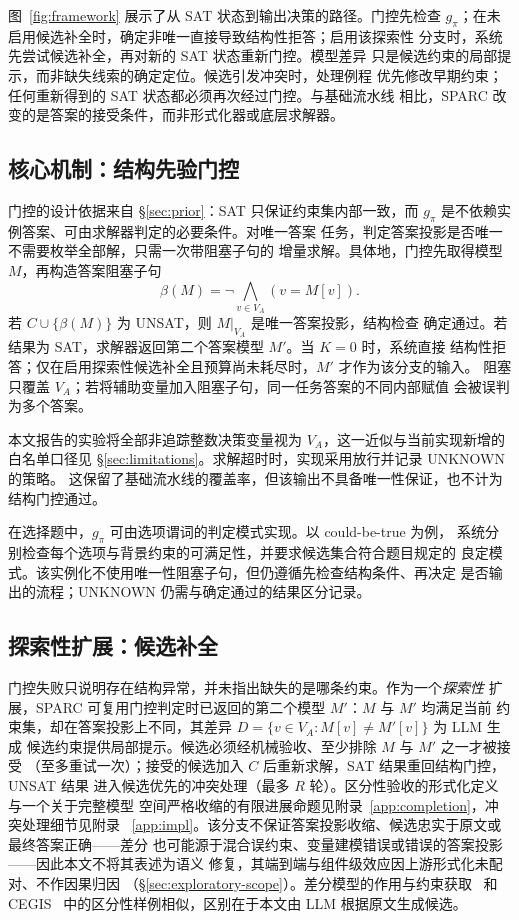 \documentclass[letterpaper]{article}
\newcommand{\method}{SPARC}
\begin{document}
图~\ref{fig:framework} 展示了从 SAT 状态到输出决策的路径。门控先检查
$g_{\pi}$；在未启用候选补全时，确定非唯一直接导致结构性拒答；启用该探索性
分支时，系统先尝试候选补全，再对新的 SAT 状态重新门控。模型差异
只是候选约束的局部提示，而非缺失线索的确定定位。候选引发冲突时，处理例程
优先修改早期约束；任何重新得到的 SAT 状态都必须再次经过门控。与基础流水线
相比，\method{} 改变的是答案的接受条件，而非形式化器或底层求解器。

\subsection{核心机制：结构先验门控}
\label{sec:pigate}

门控的设计依据来自 \S\ref{sec:prior}：SAT 只保证约束集内部一致，而
$g_{\pi}$ 是不依赖实例答案、可由求解器判定的必要条件。对唯一答案
任务，判定答案投影是否唯一不需要枚举全部解，只需一次带阻塞子句的
增量求解。具体地，门控先取得模型 $M$，再构造答案阻塞子句
\begin{equation}
  \beta(M)=\lnot\bigwedge_{v\in V_A}(v=M[v]).
\end{equation}
若 $C\cup\{\beta(M)\}$ 为 UNSAT，则 $M|_{V_A}$ 是唯一答案投影，结构检查
确定通过。若结果为 SAT，求解器返回第二个答案模型 $M'$。当 $K=0$ 时，系统直接
结构性拒答；仅在启用探索性候选补全且预算尚未耗尽时，$M'$ 才作为该分支的输入。
阻塞只覆盖 $V_A$；若将辅助变量加入阻塞子句，同一任务答案的不同内部赋值
会被误判为多个答案。

本文报告的实验将全部非追踪整数决策变量视为 $V_A$，这一近似与当前实现新增的
白名单口径见 \S\ref{sec:limitations}。求解超时时，实现采用放行并记录 UNKNOWN 的策略。
这保留了基础流水线的覆盖率，但该输出不具备唯一性保证，也不计为结构门控通过。

在选择题中，$g_{\pi}$ 可由选项谓词的判定模式实现。以 could-be-true 为例，
系统分别检查每个选项与背景约束的可满足性，并要求候选集合符合题目规定的
良定模式。该实例化不使用唯一性阻塞子句，但仍遵循先检查结构条件、再决定
是否输出的流程；UNKNOWN 仍需与确定通过的结果区分记录。

\subsection{探索性扩展：候选补全}
\label{sec:diff}

门控失败只说明存在结构异常，并未指出缺失的是哪条约束。作为一个\emph{探索性}
扩展，\method{} 可复用门控判定时已返回的第二个模型 $M'$：$M$ 与 $M'$ 均满足当前
约束集，却在答案投影上不同，其差异 $D=\{v\in V_A:M[v]\neq M'[v]\}$ 为 LLM 生成
候选约束提供局部提示。候选必须经机械验收、至少排除 $M$ 与 $M'$ 之一才被接受
（至多重试一次）；接受的候选加入 $C$ 后重新求解，SAT 结果重回结构门控，UNSAT 结果
进入候选优先的冲突处理（最多 $R$ 轮）。区分性验收的形式化定义与一个关于完整模型
空间严格收缩的有限进展命题见附录~\ref{app:completion}，冲突处理细节见附录
~\ref{app:impl}。该分支不保证答案投影收缩、候选忠实于原文或最终答案正确——差分
也可能源于混合误约束、变量建模错误或错误的答案投影——因此本文不将其表述为语义
修复，其端到端与组件级效应因上游形式化未配对、不作因果归因
（\S\ref{sec:exploratory-scope}）。差分模型的作用与约束获取~\cite{bessiere2013}
和 CEGIS~\cite{jha2010} 中的区分性样例相似，区别在于本文由 LLM 根据原文生成候选。
\end{document}

